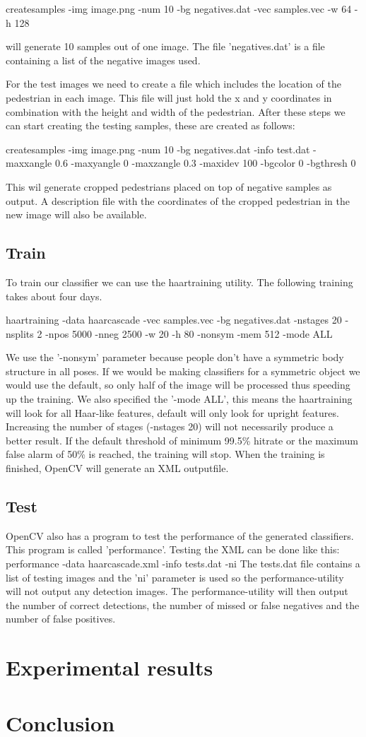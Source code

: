 \documentclass{article}
\begin{document}
createsamples -img image.png -num 10 -bg negatives.dat -vec samples.vec -w 64 -h 128

will generate 10 samples out of one image.
The file 'negatives.dat' is a file containing a list of the negative images used.

For the test images we need to create a file which includes the location of the pedestrian in each image. This file will just hold the x and y coordinates in combination with the height and width of the pedestrian.
After these steps we can start creating the testing samples, these are created as follows:

createsamples -img image.png -num 10 -bg negatives.dat -info test.dat -maxxangle 0.6 -maxyangle 0 -maxzangle 0.3 -maxidev 100 -bgcolor 0 -bgthresh 0

This wil generate cropped pedestrians placed on top of negative samples as output. A description file with the coordinates of the cropped pedestrian in the new image will also be available.




\subsection{Train}

To train our classifier we can use the haartraining utility. The following training takes about four days.

haartraining -data haarcascade -vec samples.vec -bg negatives.dat -nstages 20 -nsplits 2 -npos 5000 -nneg 2500 -w 20 -h 80 -nonsym -mem 512 -mode ALL

We use the '-nonsym' parameter because people don't have a symmetric body structure in all poses. If we would be making classifiers for a symmetric object we would use the default, so only half of the image will be processed  thus speeding up the training. We also specified the '-mode ALL', this means the haartraining will look for all Haar-like features, default will only look for upright features.
Increasing the number of stages (-nstages 20) will not necessarily produce a better result. If the default threshold of minimum 99.5\% hitrate or the maximum false alarm of 50\% is reached, the training will stop.
When the training is finished, OpenCV will generate an XML outputfile.

\subsection{Test}
OpenCV also has a program to test the performance of the generated classifiers. This program is called 'performance'. Testing the XML can be done like this:
performance -data haarcascade.xml -info tests.dat -ni
The tests.dat file contains a list of testing images and the 'ni' parameter is used so the performance-utility will not output any detection images.
The performance-utility will then output the number of correct detections, the number of missed or false negatives and the number of false positives.

\section{Experimental results}

\section{Conclusion}





\end{document}
